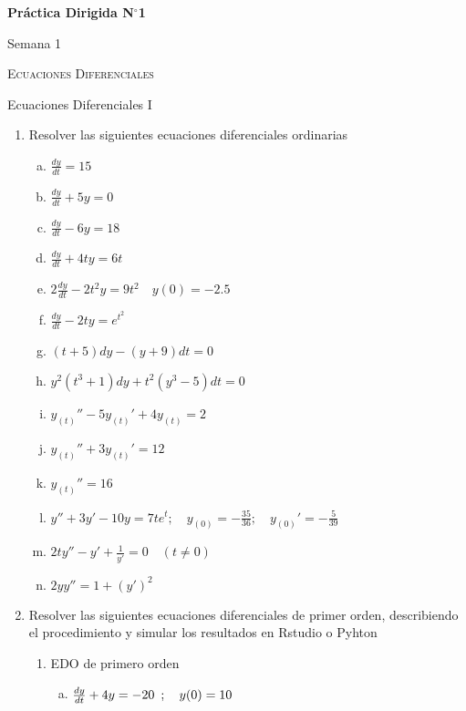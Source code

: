 \documentclass[10pt,a4paper]{article}
\begin{document}
	\begin{center}
		{\Large {\textbf{Práctica Dirigida N$^{\circ}$1}}}
		
		\small{Semana 1}
		
		\textsc{Ecuaciones Diferenciales}
		
		Ecuaciones Diferenciales I
		
	\end{center}
	
	\begin{enumerate}
		\item Resolver las siguientes ecuaciones diferenciales ordinarias
		\begin{multicols}{2}
				\begin{enumerate}[a)]
					\item $\frac{dy}{dt}=15$
					\item $\frac{dy}{dt}+5y=0$
					\item $\frac{dy}{dt}-6y=18$
					\item $\frac{dy}{dt}+4ty=6t$
					\item $2\frac{dy}{dt}-2t^2y=9t^2 \quad y(0)=-2.5$
					\item $\frac{dy}{dt}-2ty=e^{t^2}$
					\item $(t+5)dy-(y+9)dt=0$
					\item $y^2(t^3+1)dy+t^2(y^3-5)dt=0$
					\item $y_{(t)}''-5y_{(t)}'+4y_{(t)}=2$
					\item $y_{(t)}''+3y_{(t)}'=12$
					\item $y_{(t)}''=16$
					\item $y''+3y'-10y=7te^{t};\quad y_{(0)}=-\frac{35}{36};\quad y_{(0)}'=- \frac{5}{39}$
					\item $2ty''-y'+\frac{1}{y'}=0\quad (t\neq 0)$
					\item $2yy''=1+(y')^2$
				\end{enumerate}
			\end{multicols}
		\item Resolver las siguientes ecuaciones diferenciales de primer orden, describiendo el procedimiento y simular los resultados en Rstudio o Pyhton
				\begin{enumerate}[2.1]
					\item EDO de primero orden
						\begin{enumerate}[a)]
							\item $\frac{dy}{dt}+4y=-20\enskip; \quad y(0)=10$

\end{enumerate}
\end{enumerate}
\end{enumerate}
\end{document}

